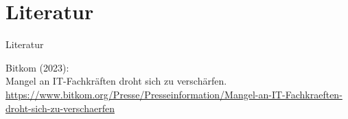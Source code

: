 \documentclass[
	aspectratio=169,	%
	onlytextwidth,		%
	t,					%
	]{beamer}
\begin{document}
%
	\appendix
	\appendix
	\section*{Literatur}
	
	\begin{frame}[allowframebreaks]{Literatur}
		\begin{thebibliography}{9}
			Bitkom (2023): \\
			Mangel an IT-Fachkräften droht sich zu verschärfen. \\
			\url{https://www.bitkom.org/Presse/Presseinformation/Mangel-an-IT-Fachkraeften-droht-sich-zu-verschaerfen}
		\end{thebibliography}
	\end{frame}
	
	\makethankyou
%
%
\end{document}
